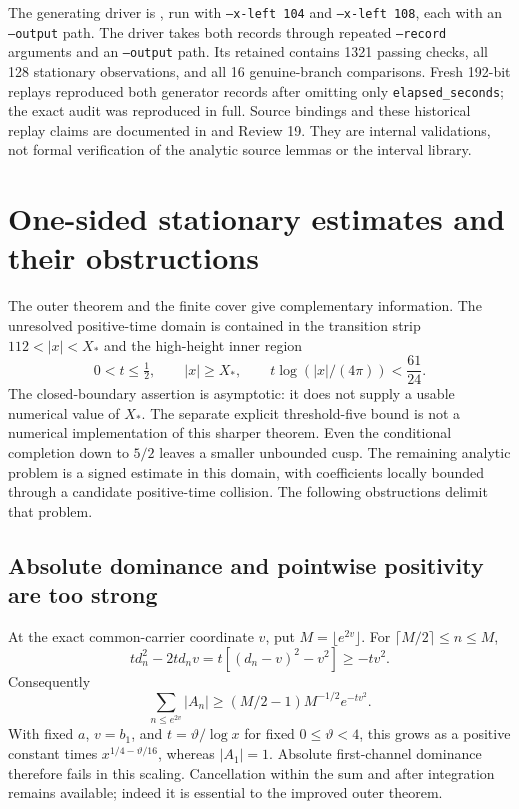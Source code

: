 \documentclass[11pt]{article}
\numberwithin{equation}{section}
\theoremstyle{definition}
\theoremstyle{remark}
\begin{document}
The generating driver is
, run with
\texttt{--x-left 104} and \texttt{--x-left 108}, each with an
\texttt{--output} path.  The driver
 takes both records
through repeated \texttt{--record} arguments and an \texttt{--output}
path.  Its retained
contains 1321 passing checks, all 128 stationary observations, and all
16 genuine-branch comparisons.  Fresh 192-bit replays reproduced both
generator records after omitting only \texttt{elapsed\_seconds}; the
exact audit was reproduced in full.  Source bindings and these historical
replay claims are documented in
and Review 19.  They are internal validations, not formal verification
of the analytic source lemmas or the interval library.

\section{One-sided stationary estimates and their obstructions}
\label{sec:remaining}

The outer theorem and the finite cover give complementary information.
The unresolved positive-time domain is contained in the transition strip
$112<|x|<X_*$ and the high-height inner region
\begin{equation}
 0<t\le\tfrac12,\qquad |x|\ge X_*,\qquad
 t\log(|x|/(4\pi))<\frac{61}{24}.
 \label{eq:remaining-domain}
\end{equation}
The closed-boundary assertion is asymptotic: it does not supply a usable
numerical value of $X_*$. The separate explicit threshold-five bound is
not a numerical implementation of this sharper theorem. Even the
conditional completion down to $5/2$ leaves a smaller unbounded cusp.
The remaining analytic problem is a signed estimate in this domain,
with coefficients locally bounded through a candidate positive-time
collision. The following obstructions delimit that problem.

\subsection{Absolute dominance and pointwise positivity are too strong}

At the exact common-carrier coordinate $v$, put
$M=\lfloor e^{2v}\rfloor$. For $\lceil M/2\rceil\le n\le M$,
\[
 td_n^2-2td_nv=t[(d_n-v)^2-v^2]\ge-tv^2.
\]
Consequently
\begin{equation}
 \sum_{n\le e^{2v}}|A_n|
 \ge(M/2-1)M^{-1/2}e^{-tv^2}.
 \label{eq:absolute-channel-obstruction}
\end{equation}
With fixed $a$, $v=b_1$, and $t=\vartheta/\log x$ for fixed
$0\le\vartheta<4$, this grows as a positive constant times
$x^{1/4-\vartheta/16}$, whereas $|A_1|=1$. Absolute first-channel
dominance therefore fails in this scaling. Cancellation within the sum
and after integration remains available; indeed it is essential to the
improved outer theorem.
\end{document}
